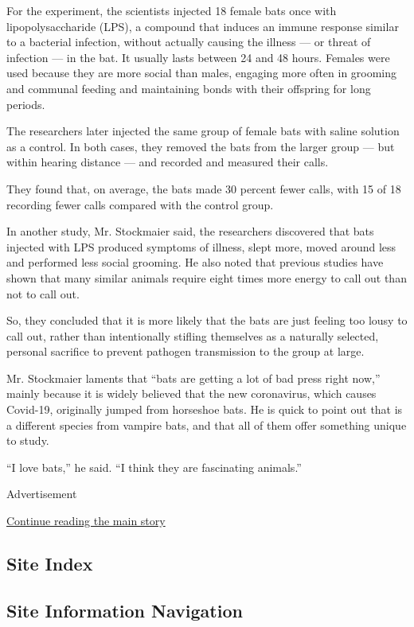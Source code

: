 For the experiment, the scientists injected 18 female bats once with
lipopolysaccharide (LPS), a compound that induces an immune response
similar to a bacterial infection, without actually causing the illness
--- or threat of infection --- in the bat. It usually lasts between 24
and 48 hours. Females were used because they are more social than males,
engaging more often in grooming and communal feeding and maintaining
bonds with their offspring for long periods.

The researchers later injected the same group of female bats with saline
solution as a control. In both cases, they removed the bats from the
larger group --- but within hearing distance --- and recorded and
measured their calls.

They found that, on average, the bats made 30 percent fewer calls, with
15 of 18 recording fewer calls compared with the control group.

In another study, Mr. Stockmaier said, the researchers discovered that
bats injected with LPS produced symptoms of illness, slept more, moved
around less and performed less social grooming. He also noted that
previous studies have shown that many similar animals require eight
times more energy to call out than not to call out.

So, they concluded that it is more likely that the bats are just feeling
too lousy to call out, rather than intentionally stifling themselves as
a naturally selected, personal sacrifice to prevent pathogen
transmission to the group at large.

Mr. Stockmaier laments that ``bats are getting a lot of bad press right
now,'' mainly because it is widely believed that the new coronavirus,
which causes Covid-19, originally jumped from horseshoe bats. He is
quick to point out that is a different species from vampire bats, and
that all of them offer something unique to study.

``I love bats,'' he said. ``I think they are fascinating animals.''

Advertisement

\protect\hyperlink{after-bottom}{Continue reading the main story}

\hypertarget{site-index}{%
\subsection{Site Index}\label{site-index}}

\hypertarget{site-information-navigation}{%
\subsection{Site Information
Navigation}\label{site-information-navigation}}

